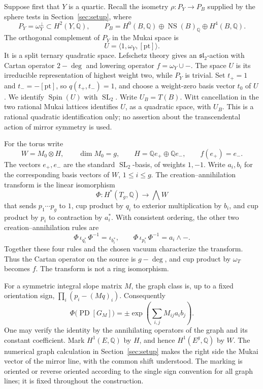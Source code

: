 \documentclass[11pt]{article}
\numberwithin{equation}{section}
\theoremstyle{definition}
\theoremstyle{remark}
\newcommand{\Q}{\mathbb Q}
\DeclareMathOperator{\PD}{PD}
\DeclareMathOperator{\Spin}{Spin}
\DeclareMathOperator{\SL}{SL}
\DeclareMathOperator{\NS}{NS}
\begin{document}
Suppose first that \(Y\) is a quartic.  Recall the isometry
\(\rho:P_Y\longrightarrow P_B\) supplied by the sphere tests in
Section~\ref{sec:setup}, where
\[
 P_Y=\omega_Y^\perp\subset H^2(Y,\Q),\qquad
 P_B=H^0(B,\Q)\oplus\NS(B)_\Q\oplus H^4(B,\Q).
\]
The orthogonal complement of \(P_Y\) in the Mukai space is
\[
 U=\langle 1,\omega_Y,[\mathrm{pt}]\rangle.
\]
It is a split ternary quadratic space.  Lefschetz theory gives an
\(\mathfrak{sl}_2\)-action with Cartan operator \(2-\deg\) and lowering
operator \(f=\omega_Y\cup-\).  The space \(U\) is its irreducible
representation of highest weight two, while \(P_Y\) is trivial.
Set \(t_+=1\) and \(t_-=-[\mathrm{pt}]\), so
\(q(t_+,t_-)=1\), and choose a weight-zero basis vector \(t_0\) of
\(U\).  We identify \(\Spin(U)\) with \(\SL_2\).
Write \(U_B=T(B)\).  Witt cancellation in the two rational Mukai lattices
identifies \(U\), as a quadratic space, with \(U_B\).
This is a rational quadratic identification only; no assertion about
the transcendental action of mirror symmetry is used.

For the torus write
\[
 W=M_0\otimes H,\qquad \dim M_0=g,\qquad
 H=\Q e_+\oplus\Q e_-,\qquad f(e_+)=e_-.
\]
The vectors \(e_+,e_-\) are the standard \(\SL_2\)-basis, of weights
\(1,-1\).  Write \(a_i,b_i\) for the corresponding basis vectors of
\(W\), \(1\le i\le g\).  The creation--annihilation transform is the
linear isomorphism
\begin{equation}\label{coh:transform}
 \Phi:H^*(T_g,\Q)\longrightarrow\bigwedge W
\end{equation}
that sends \(p_1\cdots p_g\) to \(1\), cup product by \(q_i\) to
exterior multiplication by \(b_i\), and cup product by \(p_i\) to
contraction by \(a_i^*\).  With consistent ordering, the other two
creation--annihilation rules are
\[
 \Phi\,\iota_{q_i^*}\,\Phi^{-1}=\iota_{b_i^*},
 \qquad
 \Phi\,\iota_{p_i^*}\,\Phi^{-1}=a_i\wedge-.
\]
Together these four rules and the chosen vacuum characterize the
transform.  Thus the Cartan
operator on the source is \(g-\deg\), and cup product by
\(\omega_T\) becomes \(f\).  The transform is not a ring isomorphism.

For a symmetric integral slope matrix \(M\), the graph class is, up
to a fixed orientation sign, \(\prod_i(p_i-(Mq)_i)\).  Consequently
\begin{equation}\label{coh:graph-exponential}
 \Phi\bigl(\PD[G_M]\bigr)
 =\pm\exp\left(\sum_{i,j}M_{ij}a_i b_j\right).
\end{equation}
One may verify the identity by the annihilating operators of the graph
and its constant coefficient.  Mark \(H^1(E,\Q)\) by \(H\), and hence
\(H^1(E^g,\Q)\) by \(W\).  The numerical graph calculation in
Section~\ref{sec:setup} makes the right side the Mukai vector of the
mirror line, with the common shift understood.  The marking is oriented
or reverse oriented according to the single sign convention for all
graph lines; it is fixed throughout the construction.
\end{document}
